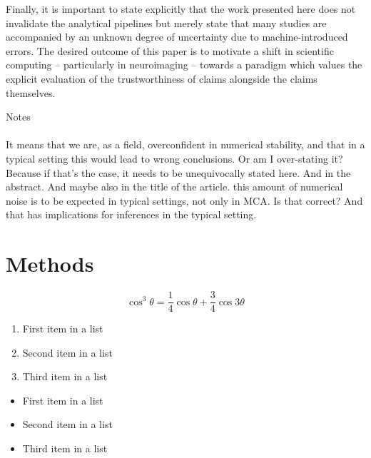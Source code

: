 \documentclass[fleqn,10pt]{SelfArx} %
\begin{document}
Finally, it is important to state explicitly that the work presented here does not invalidate the analytical pipelines but merely state that many studies are accompanied by an unknown degree of uncertainty due to machine-introduced errors. The desired outcome of this paper is to motivate a shift in scientific computing – particularly in neuroimaging – towards a paradigm which values the explicit evaluation of the trustworthiness of claims alongside the claims themselves.

{\color{orange}Notes\\\\
It means that we are, as a field, overconfident in numerical stability, and that in a typical setting this would lead
to wrong conclusions. Or am I over-stating it? Because if that's the case, it needs to be unequivocally stated here.
And in the abstract. And maybe also in the title of the article. this amount of numerical noise is to be expected in
typical settings, not only in MCA. Is that correct? And that has implications for inferences in the typical setting.
}


{\footnotesize }

\clearpage
\section*{Methods}
\begin{equation}
\cos^3 \theta =\frac{1}{4}\cos\theta+\frac{3}{4}\cos 3\theta
\label{eq:refname2}
\end{equation}

\lipsum[10] %

\begin{enumerate}[noitemsep] %
\item First item in a list
\item Second item in a list
\item Third item in a list
\end{enumerate}

\lipsum[14] %

\begin{itemize}[noitemsep] %
\item First item in a list
\item Second item in a list
\item Third item in a list
\end{itemize}
\end{document}

